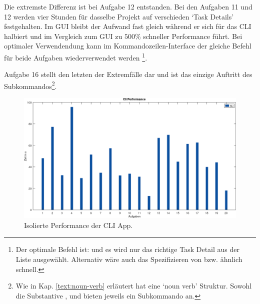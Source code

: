 \documentclass[oneside,bibliography=totocnumbered,BCOR=5mm]{scrbook}
\begin{document}
Die extremste Differenz ist bei Aufgabe 12 entstanden. Bei den Aufgaben 11 und
12 werden vier Stunden für dasselbe Projekt auf verschieden `Task Details'
festgehalten. Im GUI bleibt der Aufwand fast gleich während er sich für das
CLI halbiert und im Vergleich zum GUI zu $500\%$ schneller Performance führt.
Bei optimaler Verwendendung kann im Kommandozeilen-Interface der gleiche
Befehl für beide Aufgaben wiederverwendet werden \footnote{Der optimale Befehl
ist:  und es wird nur
das richtige Task Detail aus der Liste ausgewählt. Alternativ wäre auch das
Spezifizieren von  bzw.  ähnlich
schnell.}.

Aufgabe 16 stellt den letzten der Extremfälle dar und ist das einzige Auftritt
des  Subkommandos\footnote{Wie in Kap. \ref{text:noun-verb}
erläutert hat  eine `noun verb' Struktur. Sowohl
die Substantive ,  und
 bieten jeweils ein  Subkommando an.}.

\begin{figure}[H]
  \centering
  \includegraphics[scale=0.36]{performance-cli.png}
  \caption{Isolierte Performance der CLI App.}
  \label{fig:performance-cli}
\end{figure}
\end{document}
